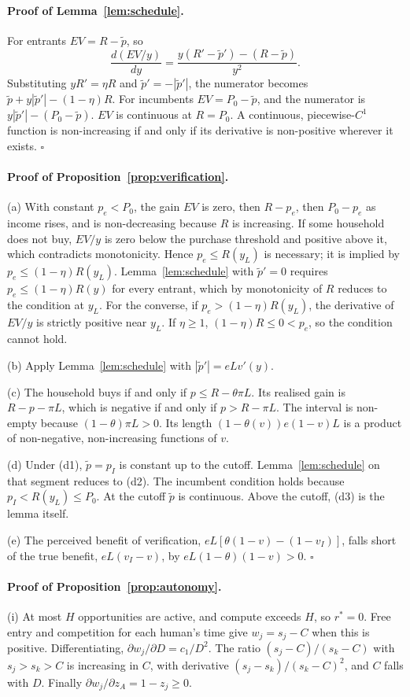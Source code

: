 \documentclass[12pt]{article}
\theoremstyle{remark}
\begin{document}
\paragraph{Proof of Lemma~\ref{lem:schedule}.} For entrants $EV=R-\tilde p$, so
\[
\frac{d(EV/y)}{dy}=\frac{y(R'-\tilde p')-(R-\tilde p)}{y^2}.
\]
Substituting $yR'=\eta R$ and $\tilde p'=-|\tilde p'|$, the numerator becomes $\tilde p+y|\tilde p'|-(1-\eta)R$. For incumbents $EV=P_0-\tilde p$, and the numerator is $y|\tilde p'|-(P_0-\tilde p)$. $EV$ is continuous at $R=P_0$. A continuous, piecewise-$C^1$ function is non-increasing if and only if its derivative is non-positive wherever it exists. $\square$

\paragraph{Proof of Proposition~\ref{prop:verification}.}
(a) With constant $p_e<P_0$, the gain $EV$ is zero, then $R-p_e$, then $P_0-p_e$ as income rises, and is non-decreasing because $R$ is increasing. If some household does not buy, $EV/y$ is zero below the purchase threshold and positive above it, which contradicts monotonicity. Hence $p_e\le R(y_L)$ is necessary; it is implied by $p_e\le(1-\eta)R(y_L)$. Lemma~\ref{lem:schedule} with $\tilde p'=0$ requires $p_e\le(1-\eta)R(y)$ for every entrant, which by monotonicity of $R$ reduces to the condition at $y_L$. For the converse, if $p_e>(1-\eta)R(y_L)$, the derivative of $EV/y$ is strictly positive near $y_L$. If $\eta\ge1$, $(1-\eta)R\le0<p_e$, so the condition cannot hold.

(b) Apply Lemma~\ref{lem:schedule} with $|\tilde p'|=eLv'(y)$.

(c) The household buys if and only if $p\le R-\theta\pi L$. Its realised gain is $R-p-\pi L$, which is negative if and only if $p>R-\pi L$. The interval is non-empty because $(1-\theta)\pi L>0$. Its length $(1-\theta(v))e(1-v)L$ is a product of non-negative, non-increasing functions of $v$.

(d) Under (d1), $\tilde p=p_I$ is constant up to the cutoff. Lemma~\ref{lem:schedule} on that segment reduces to (d2). The incumbent condition holds because $p_I<R(y_L)\le P_0$. At the cutoff $\tilde p$ is continuous. Above the cutoff, (d3) is the lemma itself.

(e) The perceived benefit of verification, $eL[\theta(1-v)-(1-v_I)]$, falls short of the true benefit, $eL(v_I-v)$, by $eL(1-\theta)(1-v)>0$. $\square$

\paragraph{Proof of Proposition~\ref{prop:autonomy}.}
(i) At most $H$ opportunities are active, and compute exceeds $H$, so $r^*=0$. Free entry and competition for each human's time give $w_j=s_j-C$ when this is positive. Differentiating, $\partial w_j/\partial D=c_1/D^2$. The ratio $(s_j-C)/(s_k-C)$ with $s_j>s_k>C$ is increasing in $C$, with derivative $(s_j-s_k)/(s_k-C)^2$, and $C$ falls with $D$. Finally $\partial w_j/\partial z_A=1-z_j\ge0$.
\end{document}
